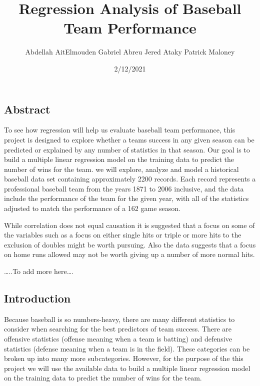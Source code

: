 \documentclass[
]{article}
\title{Regression Analysis of Baseball Team Performance}
\author{Abdellah AitElmouden \textbar{} Gabriel Abreu \textbar{} Jered
Ataky \textbar{} Patrick Maloney}
\date{2/12/2021}
\begin{document}
\maketitle

\hypertarget{abstract}{%
\subsection{Abstract}\label{abstract}}

To see how regression will help us evaluate baseball team performance,
this project is designed to explore whether a teams success in any given
season can be predicted or explained by any number of statistics in that
season. Our goal is to build a multiple linear regression model on the
training data to predict the number of wins for the team. we will
explore, analyze and model a historical baseball data set containing
approximately 2200 records. Each record represents a professional
baseball team from the years 1871 to 2006 inclusive, and the data
include the performance of the team for the given year, with all of the
statistics adjusted to match the performance of a 162 game season.

While correlation does not equal causation it is suggested that a focus
on some of the variables such as a focus on either single hits or triple
or more hits to the exclusion of doubles might be worth pursuing. Also
the data suggests that a focus on home runs allowed may not be worth
giving up a number of more normal hits.

\ldots..To add more here\ldots.

\hypertarget{introduction}{%
\subsection{Introduction}\label{introduction}}

Because baseball is so numbers-heavy, there are many different
statistics to consider when searching for the best predictors of team
success. There are offensive statistics (offense meaning when a team is
batting) and defensive statistics (defense meaning when a team is in the
field). These categories can be broken up into many more subcategories.
However, for the purpose of the this project we will use the available
data to build a multiple linear regression model on the training data to
predict the number of wins for the team.
\end{document}

